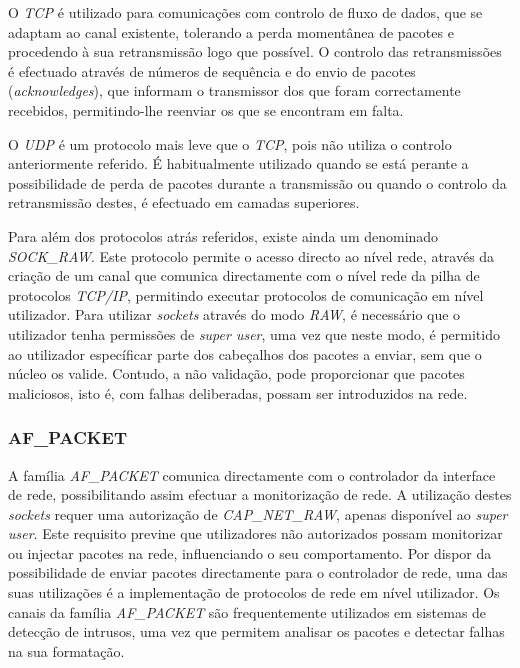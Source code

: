 O \textit{TCP} é utilizado para comunicações com controlo de fluxo de dados, que se adaptam ao canal existente, tolerando a perda momentânea de pacotes e procedendo à sua retransmissão logo que possível.
O controlo das retransmissões é efectuado através de números de sequência e do envio de pacotes (\textit{acknowledges}), que informam o transmissor dos que foram correctamente recebidos, permitindo-lhe reenviar os que se encontram em falta.

O \textit{UDP} é um protocolo mais leve que o \textit{TCP}, pois não utiliza o controlo anteriormente referido.
É habitualmente utilizado quando se está perante a possibilidade de perda de pacotes durante a transmissão ou quando o controlo da retransmissão destes, é efectuado em camadas superiores.

Para além dos protocolos atrás referidos, existe ainda um denominado \textit{SOCK\_RAW}.
Este protocolo permite o acesso directo ao nível rede, através da criação de um canal que comunica directamente com o nível rede da pilha de protocolos \textit{TCP/IP}, permitindo executar protocolos de comunicação em nível utilizador.
Para utilizar \textit{sockets} através do modo \textit{RAW}, é necessário que o utilizador tenha permissões de \textit{super user}, uma vez que neste modo, é permitido ao utilizador específicar parte dos cabeçalhos dos pacotes a enviar, sem que o núcleo os valide.
Contudo, a não validação, pode proporcionar que pacotes maliciosos, isto é, com falhas deliberadas, possam ser introduzidos na rede.
 
\subsubsection{AF\_PACKET}
\label{subsub:af_packet}

A família \textit{AF\_PACKET} comunica directamente com o controlador da interface de rede, possibilitando assim efectuar a monitorização de rede.
A utilização destes \textit{sockets} requer uma autorização de \textit{CAP\_NET\_RAW}, apenas disponível ao \textit{super user}.
Este requisito previne que utilizadores não autorizados possam monitorizar ou injectar pacotes na rede, influenciando o seu comportamento.
Por dispor da possibilidade de enviar pacotes directamente para o controlador de rede, uma das suas utilizações é a implementação de protocolos de rede em nível utilizador.
Os canais da família \textit{AF\_PACKET} são frequentemente utilizados em sistemas de detecção de intrusos, uma vez que permitem analisar os pacotes e detectar falhas na sua formatação.

